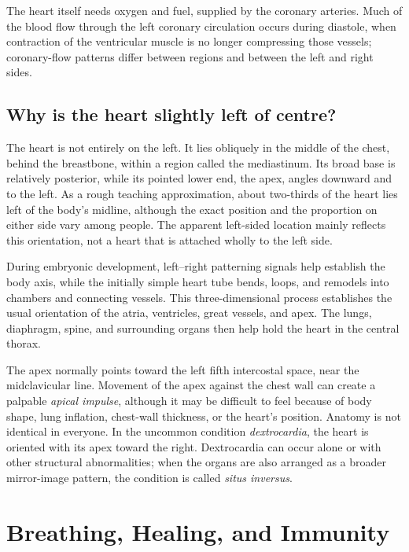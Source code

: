 \documentclass[11pt,oneside]{report}
\begin{document}
The heart itself needs oxygen and fuel, supplied by the coronary arteries. Much
of the blood flow through the left coronary circulation occurs during diastole,
when contraction of the ventricular muscle is no longer compressing those
vessels; coronary-flow patterns differ between regions and between the left and
right sides.

\section{Why is the heart slightly left of centre?}

The heart is not entirely on the left. It lies obliquely in the middle of the
chest, behind the breastbone, within a region called the mediastinum. Its broad
base is relatively posterior, while its pointed lower end, the apex, angles
downward and to the left. As a rough teaching approximation, about two-thirds
of the heart lies left of the body's midline, although the exact position and
the proportion on either side vary among people. The apparent left-sided
location mainly reflects this orientation, not a heart that is attached wholly
to the left side.

During embryonic development, left--right patterning signals help establish the
body axis, while the initially simple heart tube bends, loops, and remodels into
chambers and connecting vessels. This three-dimensional process establishes the
usual orientation of the atria, ventricles, great vessels, and apex. The lungs,
diaphragm, spine, and surrounding organs then help hold the heart in the central
thorax.

The apex normally points toward the left fifth intercostal space, near the
midclavicular line. Movement of the apex against the chest wall can create a
palpable \emph{apical impulse},
although it may be difficult to feel because of body shape, lung inflation,
chest-wall thickness, or the heart's position. Anatomy is not identical in
everyone. In the uncommon condition \emph{dextrocardia}, the heart is oriented
with its apex toward the right. Dextrocardia can occur alone or with other
structural abnormalities; when the organs are also arranged as a broader
mirror-image pattern, the condition is called \emph{situs inversus}.

\chapter{Breathing, Healing, and Immunity}
\end{document}
